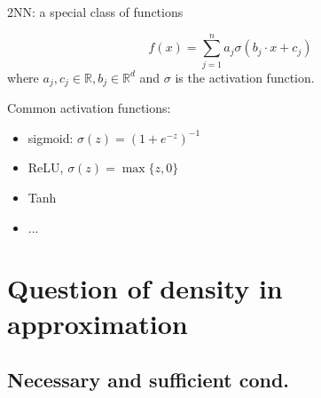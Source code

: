 \documentclass[aspectratio=32]{beamer}
\begin{document}
\begin{frame}{2NN: a special class of functions}

    $$
        f(x) = \sum_{j=1}^n a_j \sigma(b_j \cdot x + c_j)
    $$
    where $a_j, c_j \in \mathbb{R}, b_j \in \mathbb{R}^d$ and $\sigma$ is the
    activation function.

    \vspace*{3em}
    Common activation functions:
    \begin{itemize}
        \item sigmoid: $\sigma(z) = (1+ e^{-z})^{-1}$
        \item ReLU, $\sigma(z)= \max\{z, 0\}$
        \item Tanh
        \item ...
    \end{itemize}
\end{frame}






\section{Question of density in approximation}

\subsection{Necessary and sufficient cond.}
\end{document}
